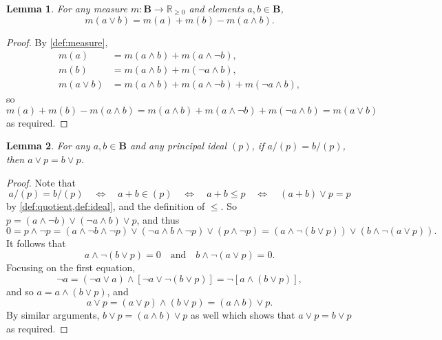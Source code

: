 \documentclass{article}
\newtheorem{lemma}{Lemma}
\theoremstyle{definition}
\theoremstyle{remark}
\begin{document}

\begin{lemma} \label{lemma:sum}
  For any measure $m\colon \mathbf{B} \to \mathbb{R}_{\ge 0}$ and elements $a, b
  \in \mathbf{B}$,
  \[
    m(a \lor b) = m(a) + m(b) - m(a \land b).
  \]
\end{lemma}
\begin{proof}
  By \cref{def:measure},
  \begin{align*}
    m(a) &= m(a \land b) + m(a \land \neg b), \\
    m(b) &= m(a \land b) + m(\neg a \land b), \\
    m(a \lor b) &= m(a \land b) + m(a \land \neg b) + m(\neg a \land b),
  \end{align*}
  so
  \[
    m(a) + m(b) - m(a \land b) = m(a \land b) + m(a \land \neg b) + m(\neg a
    \land b) = m(a \lor b)
  \]
  as required.
\end{proof}

\begin{lemma} \label{lemma:well-defined}
  For any $a, b \in \mathbf{B}$ and any principal ideal $(p)$, if $a/(p) =
  b/(p)$, then $a \lor p = b \lor p$.
\end{lemma}
\begin{proof}
  Note that
  \[
    a/(p) = b/(p) \quad \iff \quad a+b \in (p) \quad \iff \quad a+b \le p \quad
    \iff \quad (a+b) \lor p = p
  \]
  by \cref{def:quotient,def:ideal}, and the definition of $\le$. So $p = (a
  \land \neg b) \lor (\neg a \land b) \lor p$, and thus
  \[
    0 = p \land \neg p = (a \land \neg b \land \neg p) \lor (\neg a \land b
    \land \neg p) \lor (p \land \neg p) = (a \land \neg (b \lor p)) \lor (b
    \land \neg (a \lor p)).
  \]
  It follows that
  \[
    a \land \neg (b \lor p) = 0 \quad \text{and} \quad b \land \neg (a \lor p) =
    0.
  \]
  Focusing on the first equation,
  \[
    \neg a = (\neg a \lor a) \land [\neg a \lor \neg (b \lor p)] = \neg [a \land
    (b \lor p)],
  \]
  and so $a = a \land (b \lor p)$, and
  \[
    a \lor p = (a \lor p) \land (b \lor p) = (a \land b) \lor p.
  \]
  By similar arguments, $b \lor p = (a \land b) \lor p$ as well which shows that
  $a \lor p = b \lor p$ as required.
\end{proof}
\end{document}
